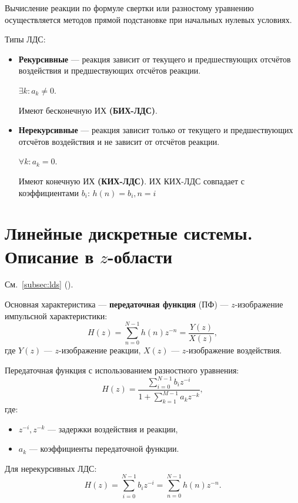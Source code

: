 \documentclass[a4paper, 14pt]{extarticle}
\begin{document}
Вычисление реакции по формуле свертки или разностому уравнению осуществляется методов прямой подстановке при начальных нулевых условиях.

Типы ЛДС:
\begin{itemize}
    \item \textbf{Рекурсивные} --- реакция зависит от текущего и предшествующих отсчётов воздействия и предшествующих отсчётов реакции.

        $ \exists k: a_k \ne 0$.

        Имеют бесконечную ИХ \textbf{(БИХ-ЛДС)}.
    \item \textbf{Нерекурсивные} --- реакция зависит только от текущего и предшествующих отсчётов воздействия и не зависит от отсчётов реакции.

        $\forall k: a_k = 0$.

        Имеют конечную ИХ \textbf{(КИХ-ЛДС)}. ИХ КИХ-ЛДС совпадает с коэффициентами $b_i$: $h(n) = b_i, n=i$
\end{itemize}

\section{Линейные дискретные системы. Описание в $z$-области}
См.~\ref{subsec:lds} ().

Основная характеристика --- \textbf{передаточная функция} (ПФ) --- $z$-изображение импульсной характеристики:
\begin{equation}\label{eq:tf}
    H(z) = \sum^{N-1}_{n=0} h(n) z^{-n} = \frac{Y(z)}{X(z)},
\end{equation}
где $Y(z)$ --- $z$-изображение реакции, $X(z)$ --- $z$-изображение воздействия.

Передаточная функция с использованием разностного уравнения:
\begin{equation}
    H(z) = \frac{ \sum^{N-1}_{i=0} b_i z^{-i} }{1 + \sum^{M-1}_{k=1} a_k z^{-k}},
\end{equation}
где:
\begin{itemize}
    \item $z^{-i}, z^{-k}$ --- задержки воздействия и реакции,
    \item $a_k$ --- коэффициенты передаточной функции.
\end{itemize}

Для нерекурсивных ЛДС:
\begin{equation}
    H(z) = \sum^{N-1}_{i=0} b_i z^{-i} = \sum^{N-1}_{n=0} h(n) z^{-n}.
\end{equation}
\end{document}
